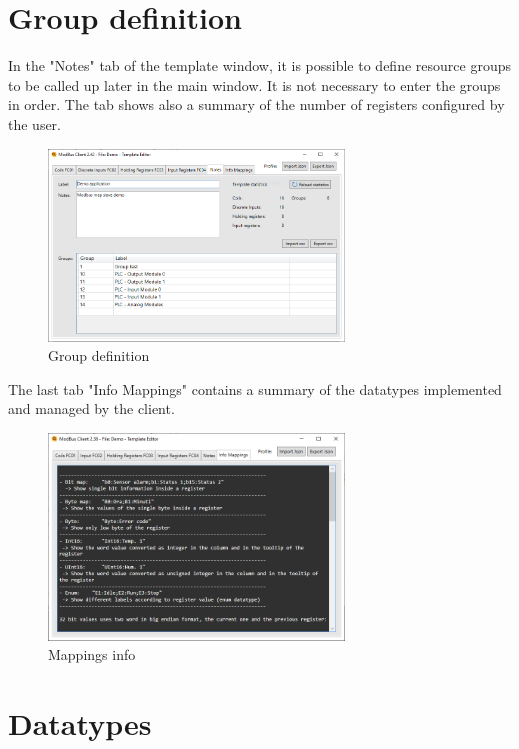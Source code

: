 \section{Group definition}

In the "Notes" tab of the template window, it is possible to define resource groups
to be called up later in the main window. It is not necessary to enter the groups in order.
The tab shows also a summary of the number of registers configured by the user.

\begin{figure}[H]
\centering
\includegraphics[width=0.70\textwidth]{../Img/ModBus_Client_Template_Group_Definition.PNG}
\caption{Group definition}
\end{figure}

The last tab "Info Mappings" contains a summary of the datatypes implemented and managed by the client.

\begin{figure}[H]
\centering
\includegraphics[width=0.70\textwidth]{../Img/ModBus_Client_Template_Info_Mappings.PNG}
\caption{Mappings info}
\end{figure}

\newpage
\section{Datatypes}

